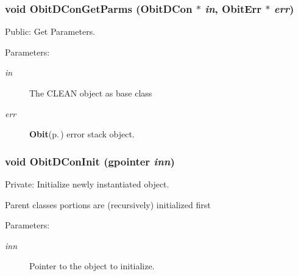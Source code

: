 \subsubsection{\setlength{\rightskip}{0pt plus 5cm}void Obit\-DCon\-Get\-Parms ({\bf Obit\-DCon} $\ast$ {\em in}, {\bf Obit\-Err} $\ast$ {\em err})}\label{ObitDCon_8c_a11}


Public: Get Parameters. 

\begin{Desc}
\item[Parameters:]
\begin{description}
\item[{\em in}]The CLEAN object as base class \item[{\em err}]{\bf Obit}{\rm (p.\,\pageref{structObit})} error stack object. \end{description}
\end{Desc}
\subsubsection{\setlength{\rightskip}{0pt plus 5cm}void Obit\-DCon\-Init (gpointer {\em inn})}\label{ObitDCon_8c_a3}


Private: Initialize newly instantiated object. 

Parent classes portions are (recursively) initialized first \begin{Desc}
\item[Parameters:]
\begin{description}
\item[{\em inn}]Pointer to the object to initialize. \end{description}
\end{Desc}
